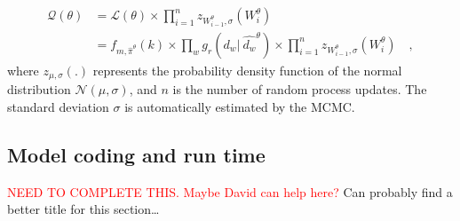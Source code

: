 \begin{equation}
    \label{eq:acc_qtt}
    \begin{split}
    \mathcal{Q}(\theta) & = \mathcal{L}(\theta) \times \prod_{i=1}^{n} z_{W^\theta_{i-1},\sigma}(W^\theta_i) \\
                        & = f_{m,\hat{\pi}^\theta}(k) \times \prod_w g_r(d_w | \:\hat{d_w}^\theta) \times \prod_{i=1}^{n} z_{W^\theta_{i-1},\sigma}(W^\theta_i) \quad ,
    \end{split}
\end{equation}
where $z_{\mu,\sigma}(.)$ represents the probability density function of the normal distribution $\mathcal{N}(\mu, \sigma)$, and $n$ is the number 
of random process updates. The standard deviation $\sigma$ is automatically estimated by the MCMC.

\subsection{Model coding and run time}
\textcolor{red}{NEED TO COMPLETE THIS. Maybe David can help here?}
Can probably find a better title for this section\dots

